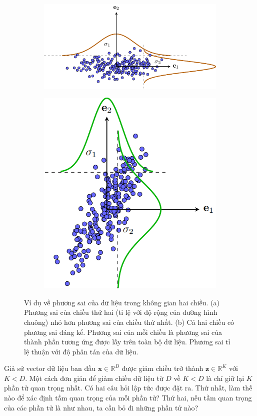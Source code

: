 \documentclass[12pt,a4paper,oneside]{report}
\numberwithin{equation}{section}
\def\R{\mathbb{R}}
\begin{document}
 \begin{figure}[t]
	\begin{subfigure}{0.59\textwidth}
		\includegraphics[width=0.99\linewidth]{pca_diagvar.pdf}
		\caption{}
		\label{fig:pca_2a}
	\end{subfigure}
	\begin{subfigure}{0.33\textwidth}
		\includegraphics[width=0.99\linewidth]{pca_var.png}
		\caption{}
		\label{fig:pca_2b}
	\end{subfigure}
	\caption{Ví dụ về phương sai của dữ liệu trong không gian hai chiều. (a)
		Phương sai của chiều thử hai (tỉ lệ với độ rộng của đường hình chuông) nhỏ
		hơn phương sai của chiều thứ nhất. (b) Cả hai chiều có phương sai đáng kể. Phương sai của
		mỗi chiều là phương sai của thành phần tương ứng được lấy trên toàn bộ dữ
		liệu. Phương sai tỉ lệ thuận với độ phân tán của dữ liệu.}
	\label{fig:pca_2}
\end{figure}
Giả sử vector dữ liệu ban đầu $\mathbf{x} \in \R^{D}$ được giảm chiều trở thành $\mathbf{z}
\in \R^K$ với $K < D$. Một cách đơn giản để giảm chiều dữ liệu từ $D$ về $K < D$ là chỉ giữ lại $K$ phần tử {quan trọng nhất}. Có hai câu hỏi lập tức
được đặt ra. Thứ nhất, làm thế nào để xác định {tầm quan trọng} của
mỗi phần tử? Thứ hai, nếu tầm quan trọng của các phần tử là như
nhau, ta cần bỏ đi những phần tử nào?
\end{document}
